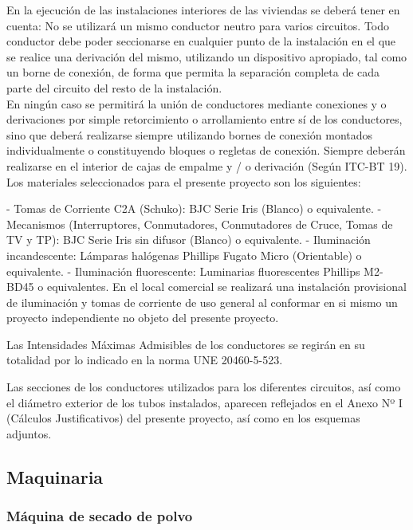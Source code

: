 En la ejecución de las instalaciones interiores de las viviendas se deberá tener en cuenta:
No se utilizará un mismo conductor neutro para varios circuitos. Todo conductor debe poder seccionarse en cualquier punto de la instalación en el que se realice una derivación del mismo, utilizando un dispositivo apropiado, tal como un borne de conexión, de forma que permita la separación completa de cada parte del circuito del resto de la instalación.\\

En ningún caso se permitirá la unión de conductores mediante conexiones y o derivaciones por simple retorcimiento o arrollamiento entre sí de los conductores, sino que deberá realizarse siempre utilizando bornes de conexión montados individualmente o constituyendo bloques o regletas de conexión. Siempre deberán realizarse en el interior de cajas de empalme y / o derivación (Según ITC-BT 19).\\

Los materiales seleccionados para el presente proyecto son los siguientes:

-	Tomas de Corriente C2A (Schuko): BJC Serie Iris (Blanco) o equivalente.
-	Mecanismos (Interruptores, Conmutadores, Conmutadores de Cruce, Tomas de TV y TP): BJC Serie Iris sin difusor (Blanco) o equivalente.
-	Iluminación incandescente: Lámparas halógenas Phillips Fugato Micro (Orientable) o equivalente.
-	Iluminación fluorescente: Luminarias fluorescentes Phillips M2-BD45 o equivalentes.
En el local comercial se realizará una instalación provisional de iluminación y tomas de corriente de uso general al conformar en si mismo un proyecto independiente no objeto del presente proyecto.

Las Intensidades Máximas Admisibles de los conductores se regirán en su totalidad por lo indicado en la norma UNE 20460-5-523.

Las secciones de los conductores utilizados para los diferentes circuitos, así como el diámetro exterior de los tubos instalados, aparecen reflejados en el Anexo Nº I (Cálculos Justificativos) del presente proyecto, así como en los esquemas adjuntos.



\subsection{Maquinaria}
	\subsubsection{Máquina de secado de polvo}
